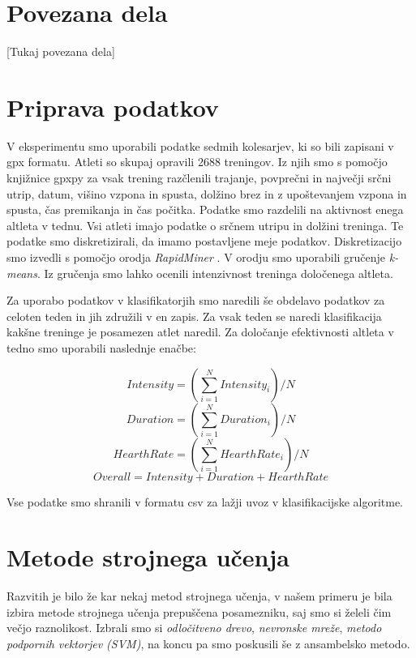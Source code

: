 \documentclass{acm_proc_article-sp}
\begin{document}
\section{Povezana dela}
[Tukaj povezana dela]

\section{Priprava podatkov}
V eksperimentu smo uporabili podatke sedmih kolesarjev, ki so bili zapisani v gpx formatu. Atleti so skupaj opravili 2688 treningov. Iz njih smo s pomočjo knjižnice gpxpy za vsak trening razčlenili trajanje, povprečni in največji srčni utrip, datum, višino vzpona in spusta, dolžino brez in z upoštevanjem vzpona in spusta, čas premikanja in čas počitka. 
Podatke smo razdelili na aktivnost enega altleta v tednu.
Vsi atleti imajo podatke o srčnem utripu in dolžini treninga.
Te podatke smo diskretizirali, da imamo postavljene meje podatkov.
Diskretizacijo smo izvedli s pomočjo orodja \textit{RapidMiner} \cite{rapidminer}.
V orodju smo uporabili gručenje \textit{k-means}. Iz gručenja smo lahko ocenili intenzivnost treninga določenega altleta.

Za uporabo podatkov v klasifikatorjih smo naredili še obdelavo podatkov za celoten teden in jih združili v en zapis.
Za vsak teden se naredi klasifikacija kakšne treninge je posamezen atlet naredil.
Za določanje efektivnosti altleta v tedno smo uporabili naslednje enačbe: 

\begin{equation}
Intensity = (\sum_{i=1}^{N} Intensity_i) / N
\end{equation}
\begin{equation}
Duration = (\sum_{i=1}^{N} Duration_i) / N
\end{equation}
\begin{equation}
HearthRate = (\sum_{i=1}^{N} HearthRate_i) / N
\end{equation}
\begin{equation} \label{eq:overall}
Overall = Intensity + Duration + HearthRate
\end{equation}

Vse podatke smo shranili v formatu csv za lažji uvoz v klasifikacijske algoritme.

\section{Metode strojnega učenja}
Razvitih je bilo že kar nekaj metod strojnega učenja, v našem primeru je bila izbira metode strojnega učenja prepuščena posamezniku, saj smo si želeli čim večjo raznolikost. Izbrali smo si \textit{odločitveno drevo}, \textit{nevronske mreže}, \textit{metodo podpornih vektorjev (SVM)}, na koncu pa smo poskusili še z ansambelsko metodo.
\end{document}
